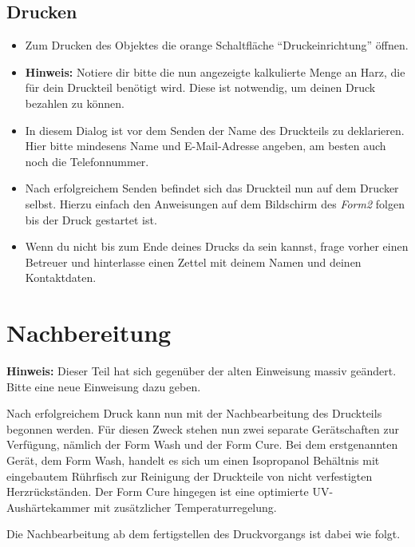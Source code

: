 \documentclass{\basedir/fablab-document}
\begin{document}
\subsection{Drucken}
\begin{itemize}

    \item Zum Drucken des Objektes die orange Schaltfläche \enquote{Druckeinrichtung} öffnen.\\
    \item \textbf{Hinweis:} Notiere dir bitte die nun angezeigte kalkulierte Menge an Harz, die für dein Druckteil benötigt wird. Diese ist notwendig, um deinen Druck bezahlen zu können.
    \item In diesem Dialog ist vor dem Senden der Name des Druckteils zu deklarieren. Hier bitte mindesens Name und E-Mail-Adresse angeben, am besten auch noch die Telefonnummer.\\
    \item Nach erfolgreichem Senden befindet sich das Druckteil nun auf dem Drucker selbst. Hierzu einfach den Anweisungen auf dem Bildschirm des \textit{Form2} folgen bis der Druck gestartet ist.
    \item Wenn du nicht bis zum Ende deines Drucks da sein kannst, frage vorher einen Betreuer und hinterlasse einen Zettel mit deinem Namen und deinen Kontaktdaten.

\end{itemize}

\pagebreak


\section{Nachbereitung}

\textbf{Hinweis:} Dieser Teil hat sich gegenüber der alten Einweisung massiv geändert. Bitte eine neue Einweisung dazu geben. 

Nach erfolgreichem Druck kann nun mit der Nachbearbeitung des Druckteils begonnen werden. Für diesen Zweck stehen nun zwei separate Gerätschaften zur Verfügung, nämlich der Form Wash und der Form Cure. Bei dem erstgenannten Gerät, dem Form Wash, handelt es sich um einen Isopropanol Behältnis mit eingebautem Rührfisch zur Reinigung der Druckteile von nicht verfestigten Herzrückständen. Der Form Cure hingegen ist eine optimierte UV-Aushärtekammer mit zusätzlicher Temperaturregelung. 

Die Nachbearbeitung ab dem fertigstellen des Druckvorgangs ist dabei wie folgt. 
\end{document}
